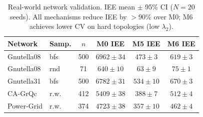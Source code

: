 \begin{table}[htbp]
\caption{Real-world network validation. IEE mean $\pm$ 95\% CI ($N=20$ seeds). All mechanisms reduce IEE by $>90\%$ over M0; M6 achieves lower CV on hard topologies (low $\lambda_2$).}
\label{tab:realworld_extended}
\centering
\scriptsize
\renewcommand{\arraystretch}{1.1}
\begin{tabular}{llcccc}
\toprule
Network & Samp. & $n$ & M0 IEE & M5 IEE & M6 IEE \\
\midrule
Gnutella08 & bfs & 500 & $6962{\pm}34$ & $473{\pm}3$ & $619{\pm}3$ \\
Gnutella08 & rnd & 71 & $640{\pm}10$ & $63{\pm}9$ & $75{\pm}1$ \\
Gnutella31 & bfs & 500 & $6782{\pm}31$ & $534{\pm}10$ & $670{\pm}3$ \\
CA-GrQc & r.w. & 412 & $5409{\pm}38$ & $388{\pm}7$ & $512{\pm}4$ \\
Power-Grid & r.w. & 374 & $4723{\pm}38$ & $357{\pm}10$ & $462{\pm}4$ \\
\bottomrule
\end{tabular}
\end{table}